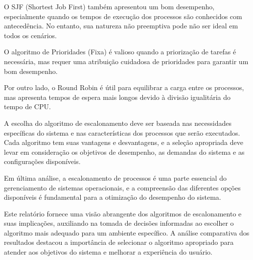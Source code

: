 \documentclass[
	12pt,				%
	openright,			%
	oneside,			%
	a4paper,			%
	chapter=TITLE,		%
	english,			%
	french,				%
	spanish,			%
	brazil				%
	]{abntex2}
\theoremstyle{definition}
\begin{document}
O SJF (Shortest Job First) também apresentou um bom desempenho, especialmente quando os tempos de execução dos processos são conhecidos com antecedência. No entanto, sua natureza não preemptiva pode não ser ideal em todos os cenários.

O algoritmo de Prioridades (Fixa) é valioso quando a priorização de tarefas é necessária, mas requer uma atribuição cuidadosa de prioridades para garantir um bom desempenho.

Por outro lado, o Round Robin é útil para equilibrar a carga entre os processos, mas apresenta tempos de espera mais longos devido à divisão igualitária do tempo de CPU.

A escolha do algoritmo de escalonamento deve ser baseada nas necessidades específicas do sistema e nas características dos processos que serão executados. Cada algoritmo tem suas vantagens e desvantagens, e a seleção apropriada deve levar em consideração os objetivos de desempenho, as demandas do sistema e as configurações disponíveis.

Em última análise, a escalonamento de processos é uma parte essencial do gerenciamento de sistemas operacionais, e a compreensão das diferentes opções disponíveis é fundamental para a otimização do desempenho do sistema.

Este relatório fornece uma visão abrangente dos algoritmos de escalonamento e suas implicações, auxiliando na tomada de decisões informadas ao escolher o algoritmo mais adequado para um ambiente específico. A análise comparativa dos resultados destacou a importância de selecionar o algoritmo apropriado para atender aos objetivos do sistema e melhorar a experiência do usuário.


\postextual



\cite{tanenbaum2010sistemas}
\end{document}
